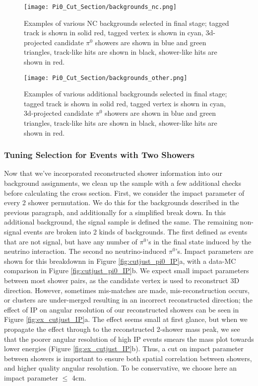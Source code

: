 \begin{figure}[h!]
\centering
\texttt{[image: Pi0\_Cut\_Section/backgrounds\_nc.png]}
\caption{ Examples of various NC backgrounds selected in final stage; tagged track is shown in solid red, tagged vertex is shown in cyan, 3d-projected candidate $\pi^0$ showers are shown in blue and green triangles, track-like hits are shown in black, shower-like hits are shown in red. }
\label{fig:backgrounds_nc}
\end{figure}

\begin{figure}[h!]
\centering
\texttt{[image: Pi0\_Cut\_Section/backgrounds\_other.png]}
\caption{ Examples of various additional backgrounds selected in final stage; tagged track is shown in solid red, tagged vertex is shown in cyan, 3d-projected candidate $\pi^0$ showers are shown in blue and green triangles, track-like hits are shown in black, shower-like hits are shown in red. }
\label{fig:backgrounds_other}
\end{figure}

\subsubsection{Tuning Selection for Events with Two Showers}
Now that we've incorporated reconstructed shower information into our background assignments, we clean up the sample with a few additional checks before calculating the cross section.  First, we consider the impact parameter of every 2 shower permutation. We do this for the backgrounds described in the previous paragraph, and additionally for a simplified break down.  In this additional background, the signal sample is defined the same.  The remaining non-signal events are broken into 2 kinds of backgrounds.  The first defined as events that are not signal, but have any number of $\pi^0$'s in the final state induced by the neutrino interaction. The second no neutrino-induced $\pi^0$'s.  Impact parameters are shown for this breakdownn in Figure \ref{fig:cutjust_pi0_IP}a, with a data-MC comparison in Figure \ref{fig:cutjust_pi0_IP}b.  We expect small impact parameters between most shower pairs, as the candidate vertex is used to reconstruct 3D direction. However, sometimes mis-matches are made, mis-reconstruction occurs, or clusters are under-merged resulting in an incorrect reconstructed direction; the effect of IP on angular resolution of our reconstructed showers can be seen in Figure \ref{fig:ex_cutjust_IP}a. The effect seems small at first glance, but when we propagate the effect through to the reconstructed 2-shower mass peak, we see that the poorer angular resolution of high IP events smears the mass plot towards lower energies (Figure \ref{fig:ex_cutjust_IP}b). Thus, a cut on impact parameter between showers is important to ensure both spatial correlation between showers, and higher quality angular resolution.  To be conservative, we choose here an impact parameter $\leq$ 4cm.  



